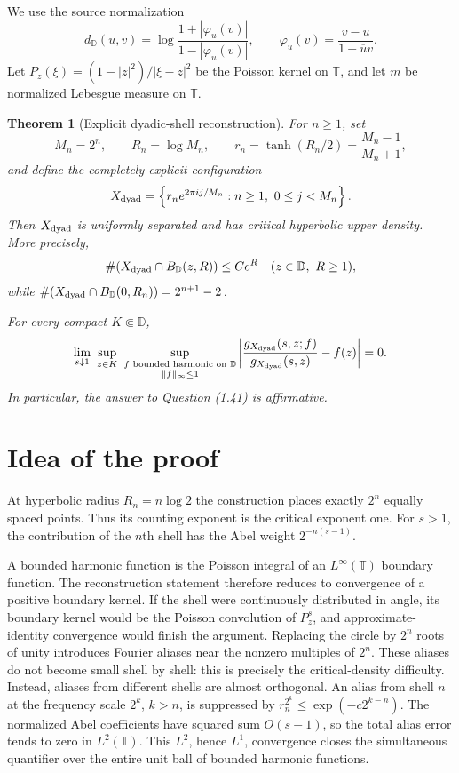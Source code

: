 \documentclass[11pt]{article}
\newtheorem{theorem}{Theorem}
\newcommand{\D}{\mathbb D}
\newcommand{\T}{\mathbb T}
\begin{document}
We use the source normalization
\[
 d_\D(u,v)=\log\frac{1+|\varphi_u(v)|}{1-|\varphi_u(v)|},
 \qquad \varphi_u(v)=\frac{v-u}{1-\overline u v}.
\]
Let $P_z(\xi)=(1-|z|^2)/|\xi-z|^2$ be the Poisson kernel on
$\T$, and let $m$ be normalized Lebesgue measure on $\T$.

\begin{theorem}[Explicit dyadic-shell reconstruction]\label{thm:main}
For $n\ge1$, set
\[
 M_n=2^n,\qquad R_n=\log M_n,\qquad
 r_n=\tanh(R_n/2)=\frac{M_n-1}{M_n+1},
\]
and define the completely explicit configuration
\[
 X_{\rm dyad}
 =\left\{r_n e^{2\pi i j/M_n}: n\ge1,\ 0\le j<M_n\right\}.
\]
Then $X_{\rm dyad}$ is uniformly separated and has critical hyperbolic
upper density.  More precisely,
\[
 \#(X_{\rm dyad}\cap B_\D(z,R))\le C e^R
 \quad(z\in\D,\ R\ge1),
\]
while $\#(X_{\rm dyad}\cap B_\D(0,R_n))=2^{n+1}-2$.

For every compact $K\Subset\D$,
\begin{equation}\label{eq:strong}
 \lim_{s\downarrow1}\ 
 \sup_{z\in K}\ 
 \sup_{\substack{f\text{ bounded harmonic on }\D\\\|f\|_\infty\le1}}
 \left|
 \frac{g_{X_{\rm dyad}}(s,z;f)}{g_{X_{\rm dyad}}(s,z)}-f(z)
 \right|=0.
\end{equation}
In particular, the answer to Question (1.41) is affirmative.
\end{theorem}

\section{Idea of the proof}

At hyperbolic radius $R_n=n\log2$ the construction places exactly $2^n$
equally spaced points.  Thus its counting exponent is the critical exponent
one.  For $s>1$, the contribution of the $n$th shell has the Abel weight
$2^{-n(s-1)}$.

A bounded harmonic function is the Poisson integral of an
$L^\infty(\T)$ boundary function.  The reconstruction statement therefore
reduces to convergence of a positive boundary kernel.  If the shell were
continuously distributed in angle, its boundary kernel would be the Poisson
convolution of $P_z^s$, and approximate-identity convergence would finish the
argument.  Replacing the circle by $2^n$ roots of unity introduces Fourier
aliases near the nonzero multiples of $2^n$.  These aliases do not become
small shell by shell: this is precisely the critical-density difficulty.
Instead, aliases from different shells are almost orthogonal.  An alias from
shell $n$ at the frequency scale $2^k$, $k>n$, is suppressed by
$r_n^{2^k}\le \exp(-c2^{k-n})$.  The normalized Abel coefficients have
squared sum $O(s-1)$, so the total alias error tends to zero in $L^2(\T)$.
This $L^2$, hence $L^1$, convergence closes the simultaneous quantifier over
the entire unit ball of bounded harmonic functions.
\end{document}
